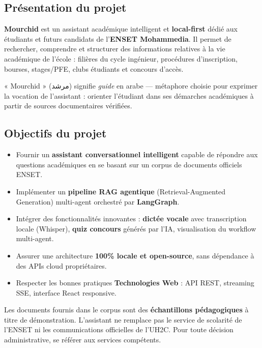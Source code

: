 \documentclass[11pt, a4paper]{article}
\begin{document}
\subsection{Présentation du projet}

\textbf{Mourchid} est un assistant académique intelligent et \textbf{local-first} dédié aux étudiants et futurs candidats de l'\textbf{ENSET Mohammedia}. Il permet de rechercher, comprendre et structurer des informations relatives à la vie académique de l'école : filières du cycle ingénieur, procédures d'inscription, bourses, stages/PFE, clubs étudiants et concours d'accès.

\begin{citationbox}
« Mourchid » (مرشد) signifie \textit{guide} en arabe — métaphore choisie pour exprimer la vocation de l'assistant : orienter l'étudiant dans ses démarches académiques à partir de sources documentaires vérifiées.
\end{citationbox}

\subsection{Objectifs du projet}

\begin{itemize}
    \item Fournir un \textbf{assistant conversationnel intelligent} capable de répondre aux questions académiques en se basant sur un corpus de documents officiels ENSET.
    \item Implémenter un \textbf{pipeline RAG agentique} (Retrieval-Augmented Generation) multi-agent orchestré par \textbf{LangGraph}.
    \item Intégrer des fonctionnalités innovantes : \textbf{dictée vocale} avec transcription locale (Whisper), \textbf{quiz concours} générés par l'IA, visualisation du workflow multi-agent.
    \item Assurer une architecture \textbf{100\% locale et open-source}, sans dépendance à des APIs cloud propriétaires.
    \item Respecter les bonnes pratiques \textbf{Technologies Web} : API REST, streaming SSE, interface React responsive.
\end{itemize}

\begin{alertwarning}[Avertissement]
Les documents fournis dans le corpus sont des \textbf{échantillons pédagogiques} à titre de démonstration. L'assistant ne remplace pas le service de scolarité de l'ENSET ni les communications officielles de l'UH2C. Pour toute décision administrative, se référer aux services compétents.
\end{alertwarning}
\end{document}
